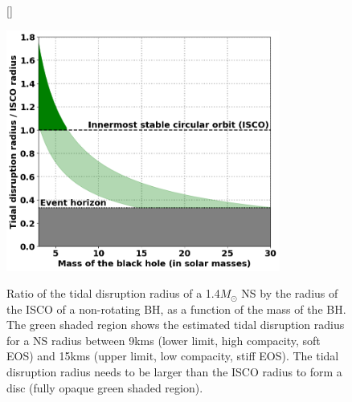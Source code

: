 \documentclass[11pt,onecolumn]{article}
\makeatletter
\newcommand{\ulxs}{ULXs\xspace}
\newcommand{\eos}{EOS\xspace}
\newcommand*{\ns}{NS\@\xspace}
\newcommand*{\bh}{BH\@\xspace}
\newcommand*{\msun}{$M_{\odot}$\@\xspace}
\makeatother
\begin{document}




\begin{figure}[!t]
\vspace*{-0.2cm}
[\FBwidth]
{\caption{Ratio of the tidal disruption radius of a 1.4\msun \ns by the radius of the ISCO of a non-rotating \bh, as a function of the mass of the \bh. The green shaded region shows the estimated tidal disruption radius for a \ns radius between 9kms (lower limit, high compacity, soft \eos) and 15kms (upper limit, low compacity, stiff \eos). The tidal disruption radius needs to be larger than the ISCO radius to form a disc (fully opaque green shaded region).}\label{fig:disc_condition}}
{\includegraphics[width=9cm]{Figures/tidal_disruption_radius.png}}
\end{figure}
\end{document}
